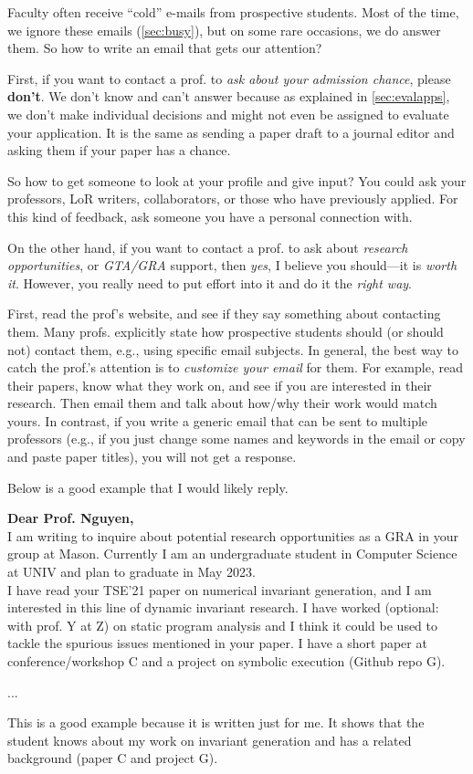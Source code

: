 \documentclass[oneside,11pt,dvipsnames]{book}
\newenvironment{commentbox}[1][]{
  \small
  \begin{mybox}
    {\small \textbf{#1}}
  }{
  \end{mybox}
}
\begin{document}
Faculty often receive ``cold'' e-mails from prospective students. Most of the time, we ignore these emails (\autoref{sec:busy}), but on some rare occasions, we do answer them. So how to write an email that gets our attention?

First, if you want to contact a prof. to \emph{ask about your admission chance}, please \textbf{don't}. We don't know and can't answer because as explained in \autoref{sec:evalapps}, we don't make individual decisions and might not even be assigned to evaluate your application.  It is the same as sending a paper draft to a journal editor and asking them if your paper has a chance.

So how to get someone to look at your profile and give input? You could ask your professors, LoR writers, collaborators, or those who have previously applied. For this kind of feedback, ask someone you have a personal connection with.

On the other hand, if you want to contact a prof. to ask about \emph{research opportunities}, or \emph{GTA/GRA} support, then \emph{yes}, I believe you should---it is \emph{worth it}. However, you really need to put effort into it and do it the \emph{right way}.

First, read the prof's website, and see if they say something about contacting them. Many profs. explicitly state how prospective students should (or should not) contact them, e.g., using specific email subjects.
In general, the best way to catch the prof.'s attention is to \emph{customize your email} for them.  For example, read their papers, know what they work on, and see if you are interested in their research. Then email them and talk about how/why their work would match yours.
In contrast, if you write a generic email that can be sent to multiple professors (e.g., if you just change some names and keywords in the email or copy and paste paper titles), you will not get a response.

Below is a good example that I would likely reply.

\begin{commentbox}[Dear Prof. Nguyen,]\\

  I am writing to inquire about potential research opportunities as a GRA in your group at Mason. Currently I am an undergraduate student in Computer Science at UNIV and plan to graduate in May 2023.
    \\

  I have read your TSE'21 paper on numerical invariant generation, and I am interested in this line of dynamic invariant research. I have worked (optional: with prof. Y at Z) on static program analysis and I think it could be used to tackle the spurious issues mentioned in your paper. I have a short paper at conference/workshop C and a project on symbolic execution (Github repo G).

  ...

 \tcblower
  This is a good example because it is written just for me.  It shows that the student knows about my work on invariant generation and has a related background (paper C and project G).
\end{commentbox}
\end{document}
